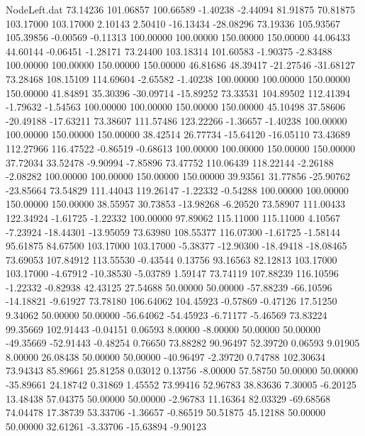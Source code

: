 \begin{filecontents}{NodeLeft.dat}
  73.14236  101.06857  100.66589    -1.40238   -2.44094   81.91875   70.81875  103.17000  103.17000    2.10143    2.50410  -16.13434  -28.08296
  73.19336  105.93567  105.39856    -0.00569   -0.11313  100.00000  100.00000  150.00000  150.00000   44.06433   44.60144   -0.06451   -1.28171
  73.24400  103.18314  101.60583    -1.90375   -2.83488  100.00000  100.00000  150.00000  150.00000   46.81686   48.39417  -21.27546  -31.68127
  73.28468  108.15109  114.69604    -2.65582   -1.40238  100.00000  100.00000  150.00000  150.00000   41.84891   35.30396  -30.09714  -15.89252
  73.33531  104.89502  112.41394    -1.79632   -1.54563  100.00000  100.00000  150.00000  150.00000   45.10498   37.58606  -20.49188  -17.63211
  73.38607  111.57486  123.22266    -1.36657   -1.40238  100.00000  100.00000  150.00000  150.00000   38.42514   26.77734  -15.64120  -16.05110
  73.43689  112.27966  116.47522    -0.86519   -0.68613  100.00000  100.00000  150.00000  150.00000   37.72034   33.52478   -9.90994   -7.85896
  73.47752  110.06439  118.22144    -2.26188   -2.08282  100.00000  100.00000  150.00000  150.00000   39.93561   31.77856  -25.90762  -23.85664
  73.54829  111.44043  119.26147    -1.22332   -0.54288  100.00000  100.00000  150.00000  150.00000   38.55957   30.73853  -13.98268   -6.20520
  73.58907  111.00433  122.34924    -1.61725   -1.22332  100.00000   97.89062  115.11000  115.11000    4.10567   -7.23924  -18.44301  -13.95059
  73.63980  108.55377  116.07300    -1.61725   -1.58144   95.61875   84.67500  103.17000  103.17000   -5.38377  -12.90300  -18.49418  -18.08465
  73.69053  107.84912  113.55530    -0.43544    0.13756   93.16563   82.12813  103.17000  103.17000   -4.67912  -10.38530   -5.03789    1.59147
  73.74119  107.88239  116.10596    -1.22332   -0.82938   42.43125   27.54688   50.00000   50.00000  -57.88239  -66.10596  -14.18821   -9.61927
  73.78180  106.64062  104.45923    -0.57869   -0.47126   17.51250    9.34062   50.00000   50.00000  -56.64062  -54.45923   -6.71177   -5.46569
  73.83224   99.35669  102.91443    -0.04151    0.06593    8.00000   -8.00000   50.00000   50.00000  -49.35669  -52.91443   -0.48254    0.76650
  73.88282   90.96497   52.39720     0.06593    9.01905    8.00000   26.08438   50.00000   50.00000  -40.96497   -2.39720    0.74788  102.30634
  73.94343   85.89661   25.81258     0.03012    0.13756   -8.00000   57.58750   50.00000   50.00000  -35.89661   24.18742    0.31869    1.45552
  73.99416   52.96783   38.83636     7.30005   -6.20125   13.48438   57.04375   50.00000   50.00000   -2.96783   11.16364   82.03329  -69.68568
  74.04478   17.38739   53.33706    -1.36657   -0.86519   50.51875   45.12188   50.00000   50.00000   32.61261   -3.33706  -15.63894   -9.90123

\end{filecontents}
